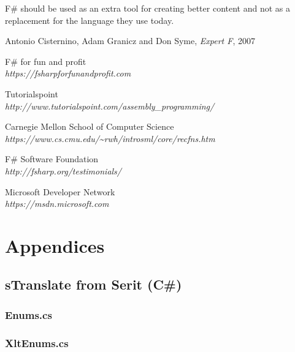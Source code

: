 \documentclass[12pt, a4paper]{article}
\begin{document}
F\# should be used as an extra tool for creating better content and not as a replacement for the language they use today. 

\newpage


\begin{thebibliography}{9}

Antonio Cisternino, Adam Granicz and Don Syme,
\textit{Expert F}, 
2007

F\# for fun and profit\\
\emph{https://fsharpforfunandprofit.com}

Tutorialspoint\\
\emph{http://www.tutorialspoint.com/assembly\_programming/}

Carnegie Mellon School of Computer Science\\
\emph{https://www.cs.cmu.edu/\textasciitilde rwh/introsml/core/recfns.htm}

F\# Software Foundation\\
\emph{http://fsharp.org/testimonials/}

Microsoft Developer Network\\
\emph{https://msdn.microsoft.com}


 
\end{thebibliography}
\newpage

\appendix
\footnotesize
\section{Appendices}	
\subsection{sTranslate from Serit (C\#)}
\label{AppendixCSharp}
\subsubsection{Enums.cs}

\newpage
\subsubsection{XltEnums.cs}

\newpage
\end{document}
